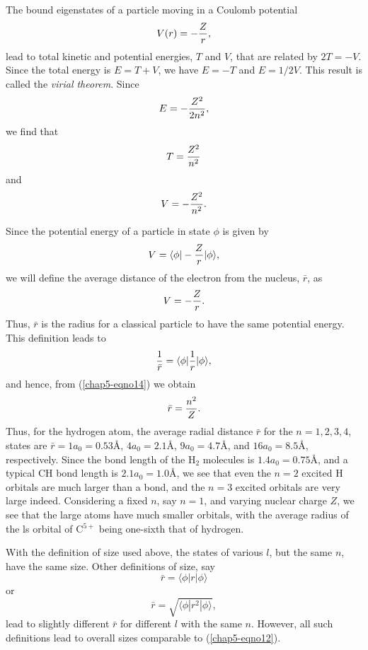 The bound eigenstates of a particle moving in a Coulomb potential
\begin{equation}
V(r) = - {Z \over r},
\end{equation}
lead to total kinetic and potential energies, $T$ and $V$, that are related 
by $2T = - V$.  Since the total energy is $E = T + V$, we have $E = - T$ 
and $E = 1/2V$.  This result is called the \emph{virial theorem}. Since
\begin{equation}
E = - {Z^2 \over 2n^2} ,
\end{equation}
we find that
\begin{equation}
T = {Z^2 \over n^2}
\label{chap5-eqno14}
\end{equation}
and
\begin{equation}
V = - {Z^2 \over n^2}.
\end{equation}
    
Since the potential energy of a particle in state $\phi$ is given by
\begin{equation}
V = \langle \phi | - {Z \over r} | \phi \rangle ,
\end{equation}
we will define the average distance of the electron from the nucleus, 
${\bar r}$, as
\begin{equation}
V = - {Z \over r} .
\end{equation}
Thus, ${\bar r}$ is the radius for a classical particle to have the same 
potential energy.  This definition leads to
\begin{equation}
{1 \over {\bar r}} = \langle \phi | {1 \over r} | \phi \rangle ,
\end{equation}
and hence, from (\ref{chap5-eqno14}) we obtain
\begin{equation}
{\bar r} = {n^2 \over Z} .
\end{equation}
Thus, for the hydrogen atom, the average radial distance ${\bar r}$ for 
the $n = 1 , 2, 3 , 4$, states are ${\bar r} = 1a_0 = 0.53$\AA, $4a_0 = 
2.1$\AA, $9a_0 = 4.7$\AA, and $16a_0 = 8.5$\AA,
respectively.  Since the bond length of the H$_2$ molecules is $1.4a_0 = 
0.75$\AA, and a typical CH bond length is $2.1a_0 = 1.0$\AA, we see that 
even the $n = 2$ excited H orbitals are much larger than a bond, and the $n = 
3$ excited orbitals are very large indeed.  Considering a fixed $n$, say $n = 
1$, and varying nuclear charge $Z$, we see that the large
atoms have much smaller orbitals, with the average radius of the ls orbital 
of C$^{5+}$ being one-sixth that of hydrogen.

With the definition of size used above, the states of various $l$, 
but the same $n$, have the same size.  Other definitions of size, say
\begin{equation}
{\bar r} = \langle \phi | r | \phi \rangle
\end{equation}
or
\begin{equation}
{\bar r} = \sqrt{\langle \phi | r^2 | \phi \rangle},
\end{equation}
lead to slightly different ${\bar r}$ for different $l$ with the same $n$.  
However, all such definitions lead to overall sizes comparable to
(\ref{chap5-eqno12}). 


